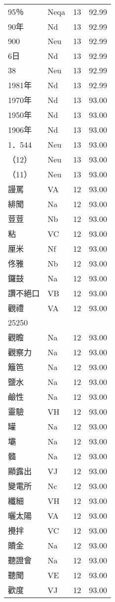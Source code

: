 \documentclass[twocolumn]{book}
\begin{document}
\begin{supertabular}{llrr}
95％ & Neqa & 13 &  92.99\\
90年 & Nd & 13 &  92.99\\
900 & Neu & 13 &  92.99\\
6日 & Nd & 13 &  92.99\\
38 & Neu & 13 &  92.99\\
1981年 & Nd & 13 &  92.99\\
1970年 & Nd & 13 &  93.00\\
1950年 & Nd & 13 &  93.00\\
1906年 & Nd & 13 &  93.00\\
1．544 & Neu & 13 &  93.00\\
（12） & Neu & 13 &  93.00\\
（11） & Neu & 13 &  93.00\\
謾罵 & VA & 12 &  93.00\\
緋聞 & Na & 12 &  93.00\\
荳荳 & Nb & 12 &  93.00\\
粘 & VC & 12 &  93.00\\
厘米 & Nf & 12 &  93.00\\
佟雅 & Nb & 12 &  93.00\\
鑼鼓 & Na & 12 &  93.00\\
讚不絕口 & VB & 12 &  93.00\\
觀禮 & VA & 12 &  93.00\\
25250\\
觀瞻 & Na & 12 &  93.00\\
觀察力 & Na & 12 &  93.00\\
籬笆 & Na & 12 &  93.00\\
鹽水 & Na & 12 &  93.00\\
鹼性 & Na & 12 &  93.00\\
靈驗 & VH & 12 &  93.00\\
罐 & Na & 12 &  93.00\\
壩 & Na & 12 &  93.00\\
髓 & Na & 12 &  93.00\\
顯露出 & VJ & 12 &  93.00\\
變電所 & Nc & 12 &  93.00\\
纖細 & VH & 12 &  93.00\\
曬太陽 & VA & 12 &  93.00\\
攪拌 & VC & 12 &  93.00\\
贖金 & Na & 12 &  93.00\\
聽證會 & Na & 12 &  93.00\\
聽聞 & VE & 12 &  93.00\\
歡度 & VJ & 12 &  93.00\\

\end{supertabular}
\end{document}
